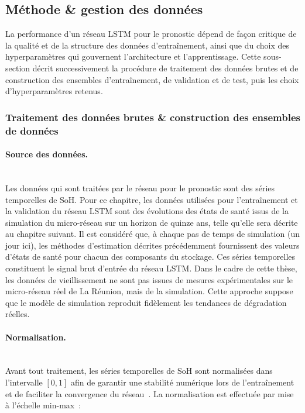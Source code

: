 \subsection{Méthode \& gestion des données}

La performance d'un réseau LSTM pour le pronostic dépend de façon critique de la qualité et de la structure des données d'entraînement, ainsi que du choix des hyperparamètres qui gouvernent l'architecture et l'apprentissage. Cette sous-section décrit successivement la procédure de traitement des données brutes et de construction des ensembles d'entraînement, de validation et de test, puis les choix d'hyperparamètres retenus.

\subsubsection{Traitement des données brutes \& construction des ensembles de données}

\paragraph{Source des données.}\hfill \\
Les données qui sont traitées par le réseau pour le pronostic sont des séries temporelles de SoH. Pour ce chapitre, les données utilisées pour l'entraînement et la validation du réseau LSTM sont des évolutions des états de santé issus de la simulation du micro-réseau sur un horizon de quinze ans, telle qu'elle sera décrite au chapitre suivant. Il est considéré que, à chaque pas de temps de simulation (un jour ici), les méthodes d'estimation décrites précédemment fournissent des valeurs d'états de santé pour chacun des composants du stockage. Ces séries temporelles constituent le signal brut d'entrée du réseau LSTM.
Dans le cadre de cette thèse, les données de vieillissement ne sont pas issues de mesures expérimentales sur le micro-réseau réel de La Réunion, mais de la simulation. Cette approche suppose que le modèle de simulation reproduit fidèlement les tendances de dégradation réelles.

\paragraph{Normalisation.}\hfill \\
Avant tout traitement, les séries temporelles de SoH sont normalisées dans l'intervalle $[0, 1]$ afin de garantir une stabilité numérique lors de l'entraînement et de faciliter la convergence du réseau~\cite{heaton_ian_2018}. La normalisation est effectuée par mise à l'échelle min-max~:

